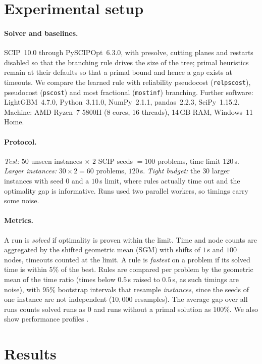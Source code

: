 \documentclass[11pt,a4paper]{article}
\newcommand{\sbr}[1]{\texttt{#1}}
\begin{document}
\section{Experimental setup}
\paragraph{Solver and baselines.} SCIP~10.0 \citep{hojny2025scip10} through PySCIPOpt~6.3.0, with presolve, cutting planes and restarts disabled so that the branching rule drives the size of the tree; primal heuristics remain at their defaults so that a primal bound and hence a gap exists at timeouts. We compare the learned rule with reliability pseudocost (\sbr{relpscost}), pseudocost (\sbr{pscost}) and most fractional (\sbr{mostinf}) branching. Further software: LightGBM~4.7.0, Python~3.11.0, NumPy~2.1.1, pandas~2.2.3, SciPy~1.15.2. Machine: AMD Ryzen~7 5800H (8 cores, 16 threads), 14\,GB RAM, Windows~11 Home.
\paragraph{Protocol.} \emph{Test:} $50$ unseen instances $\times$ $2$ SCIP seeds $=100$ problems, time limit $120$\,s. \emph{Larger instances:} $30\times 2=60$ problems, $120$\,s. \emph{Tight budget:} the $30$ larger instances with seed $0$ and a $10$\,s limit, where rules actually time out and the optimality gap is informative. Runs used two parallel workers, so timings carry some noise.
\paragraph{Metrics.} A run is \emph{solved} if optimality is proven within the limit. Time and node counts are aggregated by the shifted geometric mean (SGM) with shifts of $1$\,s and $100$ nodes, timeouts counted at the limit. A rule is \emph{fastest} on a problem if its solved time is within $5\%$ of the best. Rules are compared per problem by the geometric mean of the time ratio (times below $0.5$\,s raised to $0.5$\,s, as such timings are noise), with $95\%$ bootstrap intervals \citep{efron1979bootstrap} that resample \emph{instances}, since the seeds of one instance are not independent ($10{,}000$ resamples). The average gap over all runs counts solved runs as $0$ and runs without a primal solution as $100\%$. We also show performance profiles \citep{dolan2002benchmarking}.
 
\section{Results}
\end{document}
